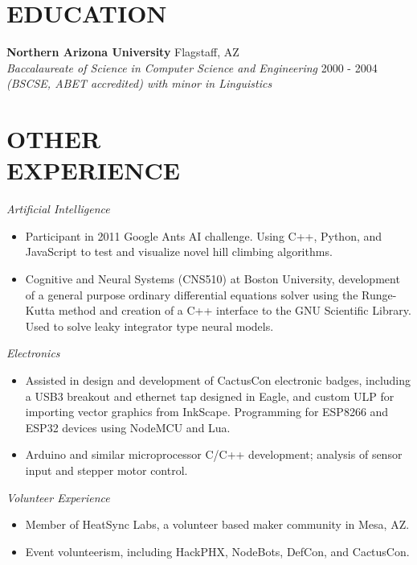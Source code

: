 \documentclass[line,margin]{res}
\begin{document}
\begin{resume}
  \section{EDUCATION}
          {\bf Northern Arizona University} \hfill Flagstaff, AZ\\
          {\sl Baccalaureate of Science in Computer Science and Engineering} \hfill 2000 - 2004\\
          {\sl (BSCSE, ABET accredited) with minor in Linguistics}

  \section{OTHER\\EXPERIENCE}
          \emph{Artificial Intelligence}
          \begin{itemize} \itemsep -2pt
          \item
            Participant in 2011 Google Ants AI challenge. Using C++, Python, and JavaScript to test
            and visualize novel hill climbing algorithms.
          \item
            Cognitive and Neural Systems (CNS510) at Boston University,
            development of a general purpose ordinary differential equations solver using the Runge-Kutta
            method and creation of a C++ interface to the GNU Scientific Library. Used to solve leaky
            integrator type neural models.
          \end{itemize}

          \emph{Electronics}
          \begin{itemize} \itemsep -2pt
          \item
            Assisted in design and development of CactusCon electronic badges, including a USB3 breakout and ethernet tap designed in Eagle, and custom ULP for importing
            vector graphics from InkScape. Programming for ESP8266 and ESP32 devices using NodeMCU and Lua.
          \item
            Arduino and similar microprocessor C/C++ development; analysis of sensor input and stepper motor control.
          \end{itemize}

          \emph{Volunteer Experience}
          \begin{itemize} \itemsep -2pt %
          \item
            Member of HeatSync Labs, a volunteer based maker community in Mesa, AZ.
          \item
            Event volunteerism, including HackPHX, NodeBots, DefCon, and CactusCon.
          \end{itemize}


\end{resume}
\end{document}
